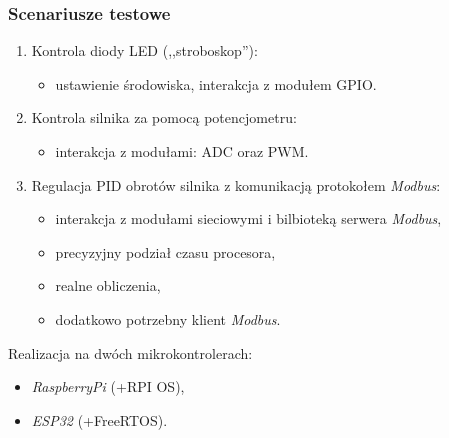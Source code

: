 \documentclass{beamer}
\newcommand{\Esp}{\emph{ESP32}}
\newcommand{\Rpi}{\emph{RaspberryPi}}
\newcommand{\Modbus}{\emph{Modbus}}
\begin{document}
\begin{frame}
	\frametitle{Scenariusze testowe}
	\begin{enumerate}
		\item Kontrola diody LED (,,stroboskop''):
		      \begin{itemize}
			      \item ustawienie środowiska, interakcja z modułem GPIO.
		      \end{itemize}
		\item Kontrola silnika za pomocą potencjometru:
		      \begin{itemize}
			      \item interakcja z modułami: ADC oraz PWM.
		      \end{itemize}
		\item Regulacja PID obrotów silnika z komunikacją protokołem \Modbus{}:
		      \begin{itemize}
			      \item interakcja z modułami sieciowymi i bilbioteką serwera \Modbus{},
			      \item precyzyjny podział czasu procesora,
			      \item realne obliczenia,
			      \item dodatkowo potrzebny klient \Modbus{}.
		      \end{itemize}
	\end{enumerate}

	Realizacja na dwóch mikrokontrolerach:
	\begin{multicols}{2}
		\begin{itemize}
			\item \Rpi{} (+RPI OS),
			\item \Esp{} (+FreeRTOS).
		\end{itemize}
	\end{multicols}
\end{frame}
\end{document}
